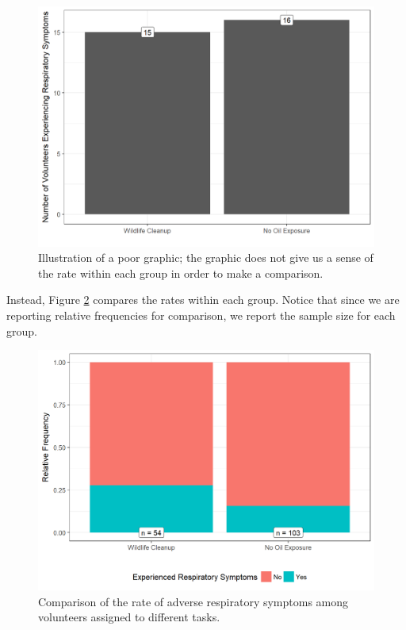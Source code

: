 \documentclass[]{book}
\theoremstyle{definition}
\theoremstyle{definition}
\theoremstyle{definition}
\theoremstyle{remark}
\begin{document}
\begin{figure}

{\centering \includegraphics[width=0.8\linewidth]{./Images/summaries-bad-barchart-1} 

}

\caption{Illustration of a poor graphic; the graphic does not give us a sense of the rate within each group in order to make a comparison.}\label{fig:summaries-bad-barchart}
\end{figure}

Instead, Figure \ref{fig:summaries-good-barchart} compares the rates
within each group. Notice that since we are reporting relative
frequencies for comparison, we report the sample size for each group.

\begin{figure}

{\centering \includegraphics[width=0.8\linewidth]{./Images/summaries-good-barchart-1} 

}

\caption{Comparison of the rate of adverse respiratory symptoms among volunteers assigned to different tasks.}\label{fig:summaries-good-barchart}
\end{figure}
\end{document}
